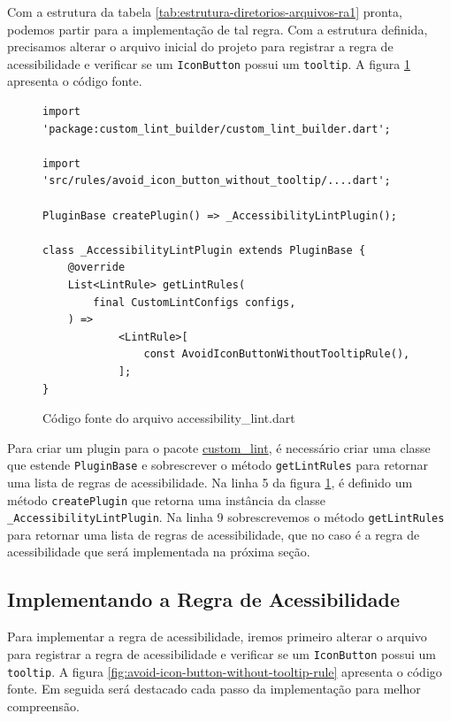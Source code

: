 Com a estrutura da tabela \ref{tab:estrutura-diretorios-arquivos-ra1} pronta, podemos partir para a implementação de tal regra. 
Com a estrutura definida, precisamos alterar o arquivo inicial do projeto  para registrar a regra de acessibilidade e verificar se um \texttt{IconButton} possui um \texttt{tooltip}. A figura \ref{fig:accessibility-lint} apresenta o código fonte.

\begin{figure}[!htbp]
\centering
\caption{Código fonte do arquivo accessibility\_lint.dart}\label{fig:accessibility-lint}
\begin{lstlisting}
import 'package:custom_lint_builder/custom_lint_builder.dart';

import 'src/rules/avoid_icon_button_without_tooltip/....dart';

PluginBase createPlugin() => _AccessibilityLintPlugin();

class _AccessibilityLintPlugin extends PluginBase {
	@override
	List<LintRule> getLintRules(
		final CustomLintConfigs configs,
	) =>
			<LintRule>[
				const AvoidIconButtonWithoutTooltipRule(),
			];
}		
\end{lstlisting}
\vspace{2mm}
\end{figure}

Para criar um plugin para o pacote \href{https://pub.dev/packages/custom_lint}{custom\_lint}, é necessário criar uma classe que estende \texttt{PluginBase} e sobrescrever o método \texttt{getLintRules} para retornar uma lista de regras de acessibilidade. Na linha 5 da figura \ref{fig:accessibility-lint}, é definido um método \texttt{createPlugin} que retorna uma instância da classe \texttt{\_AccessibilityLintPlugin}. Na linha 9 sobrescrevemos o método \texttt{getLintRules} para retornar uma lista de regras de acessibilidade, que no caso é a regra de acessibilidade  que será implementada na próxima seção.

\subsection{Implementando a Regra de Acessibilidade}

Para implementar a regra de acessibilidade, iremos primeiro alterar o arquivo  para registrar a regra de acessibilidade e verificar se um \texttt{IconButton} possui um \texttt{tooltip}. A figura \ref{fig:avoid-icon-button-without-tooltip-rule} apresenta o código fonte. Em seguida será destacado cada passo da implementação para melhor compreensão.

